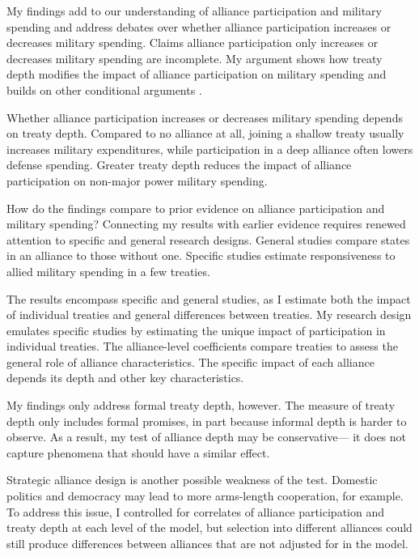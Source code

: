 \documentclass[12pt]{article}
\begin{document}
My findings add to our understanding of alliance participation and military spending and address debates over whether alliance participation increases or decreases military spending. 
Claims alliance participation only increases or decreases military spending are incomplete. 
My argument shows how treaty depth modifies the impact of alliance participation on military spending and builds on other conditional arguments \citep{DigiuseppePoast2016}. 


Whether alliance participation increases or decreases military spending depends on treaty depth. 
Compared to no alliance at all, joining a shallow treaty usually increases military expenditures, while participation in a deep alliance often lowers defense spending. 
Greater treaty depth reduces the impact of alliance participation on non-major power military spending. 


How do the findings compare to prior evidence on alliance participation and military spending? 
Connecting my results with earlier evidence requires renewed attention to specific and general research designs. 
General studies compare states in an alliance to those without one. 
Specific studies estimate responsiveness to allied military spending in a few treaties. 


The results encompass specific and general studies, as I estimate both the impact of individual treaties and general differences between treaties. 
My research design emulates specific studies by estimating the unique impact of participation in individual treaties. 
The alliance-level coefficients compare treaties to assess the general role of alliance characteristics.   
The specific impact of each alliance depends its depth and other key characteristics. 


My findings only address formal treaty depth, however. 
The measure of treaty depth only includes formal promises, in part because informal depth is harder to observe. 
As a result, my test of alliance depth may be conservative--- it does not capture phenomena that should have a similar effect. 


Strategic alliance design is another possible weakness of the test. 
Domestic politics \citep{Davis2004} and democracy \citep{Chibaetal2015} may lead to more arms-length cooperation, for example.   
To address this issue, I controlled for correlates of alliance participation and treaty depth at each level of the model, but selection into different alliances could still produce differences between alliances that are not adjusted for in the model. 
\end{document}

